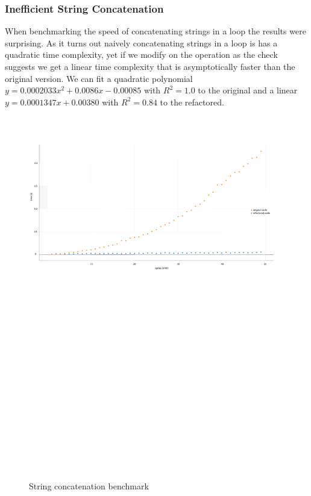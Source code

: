 \subsubsection{Inefficient String Concatenation}
\par When benchmarking the speed of concatenating strings in a loop the results were surprising. As it turns out naively concatenating strings in a loop is has a quadratic time complexity, yet if we modify on the operation as the check suggests we get a linear time complexity that is asymptotically faster than the original version. We can fit a quadratic polynomial $y=0.0002033x^2+0.0086x-0.00085$ with $R^2=1.0$ to the original and a linear $y=0.0001347x+0.00380$ with $R^2=0.84$ to the refactored.
\begin{figure}
	\caption{String concatenation benchmark}
	\includegraphics[scale=0.7]{images/string_concat.pdf}
\end{figure}
